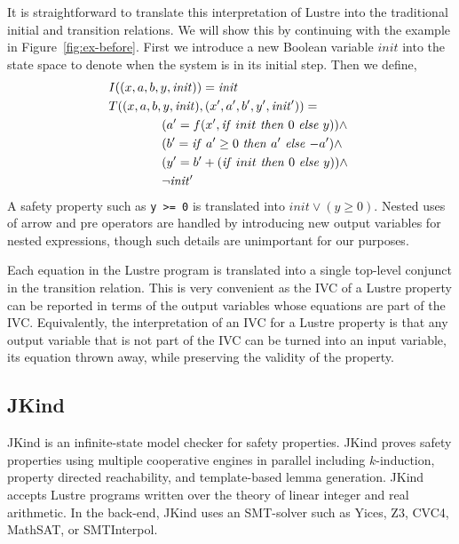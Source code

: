 It is straightforward to translate this interpretation of Lustre into
the traditional initial and transition relations. We will show this by
continuing with the example in Figure~\ref{fig:ex-before}. First we
introduce a new Boolean variable $init$ into the state space to denote
when the system is in its initial step. Then we define,
\begin{align*}
  &I((x, a, b, y, \mathit{init})) = \mathit{init} \\
  &T((x, a, b, y, \mathit{init}), (x', a', b', y', \mathit{init'})) = \\
  &\hspace{1.5cm} (a' = f(x', \mathit{if}\ {init}\ \mathit{then}\ {0}\ \mathit{else}\ {y})) \land~ \\
  &\hspace{1.5cm} (b' = \mathit{if}\ {a' \geq 0}\ \mathit{then}\ {a'}\ \mathit{else}\ {-a'}) \land~ \\
  &\hspace{1.5cm} (y' = b' + (\mathit{if}\ {init}\ \mathit{then}\ {0}\ \mathit{else}\ {y})) \land ~\\
  &\hspace{1.5cm} \neg\mathit{init'}
\end{align*}
A safety property such as {\tt y >= 0} is translated into
$\mathit{init} \lor (y \geq 0)$. Nested uses of arrow and pre
operators are handled by introducing new output variables for nested
expressions, though such details are unimportant for our purposes.

Each equation in the Lustre program is translated into a single
top-level conjunct in the transition relation. This is very convenient
as the IVC of a Lustre property can be reported in terms of the output
variables whose equations are part of the IVC. Equivalently, the
interpretation of an IVC for a Lustre property is that any output
variable that is not part of the IVC can be turned into an input
variable, its equation thrown away, while preserving the validity of
the property.

\subsection{JKind}

JKind is an infinite-state model checker for safety properties. JKind
proves safety properties using multiple cooperative engines in
parallel including $k$-induction, property directed reachability, and
template-based lemma generation. JKind accepts Lustre programs written
over the theory of linear integer and real arithmetic. In the back-end,
JKind uses an SMT-solver such as Yices, Z3, CVC4, MathSAT, or
SMTInterpol.

